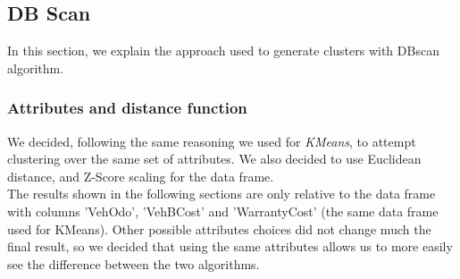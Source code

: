\documentclass{article}
\begin{document}
	
	
	
	\subsection{DB Scan}
	In this section, we explain the approach used to generate clusters with DBscan algorithm.
	
	\subsubsection{Attributes and distance function}
	
	We decided, following the same reasoning we used for \emph{KMeans}, to attempt clustering over the same set of attributes. We also decided to use Euclidean distance, and Z-Score scaling for the data frame.\\
	The results shown in the following sections are only relative to the data frame with columns 'VehOdo', 'VehBCost' and 'WarrantyCost' (the same data frame used for KMeans). Other possible attributes choices did not change much the final result, so we decided that using the same attributes allows us to more easily see the difference between the two algorithms.
	
\end{document}
